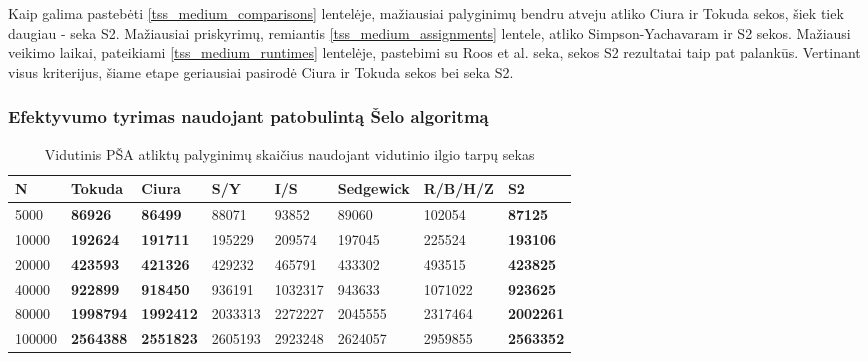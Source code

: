\documentclass{VUMIFInfKursinis}
\begin{document}
Kaip galima pastebėti \ref{tss_medium_comparisons} lentelėje, mažiausiai palyginimų bendru atveju atliko Ciura ir Tokuda sekos, šiek tiek daugiau - seka S2.
Mažiausiai priskyrimų, remiantis \ref{tss_medium_assignments} lentele, atliko Simpson-Yachavaram ir S2 sekos.
Mažiausi veikimo laikai, pateikiami \ref{tss_medium_runtimes} lentelėje, pastebimi su Roos et al. seka, sekos S2 rezultatai taip pat palankūs.
Vertinant visus kriterijus, šiame etape geriausiai pasirodė Ciura ir Tokuda sekos bei seka S2.

\subsubsection{Efektyvumo tyrimas naudojant patobulintą Šelo algoritmą}

\begin{table}[H]
  \caption{Vidutinis PŠA atliktų palyginimų skaičius naudojant vidutinio ilgio tarpų sekas}
  \label{iss_medium_comparisons}
  \begin{tabular}{|l|l|l|l|l|l|l|l|}
  \hline
  N      & Tokuda           & Ciura            & S/Y     & I/S     & Sedgewick & R/B/H/Z & S2               \\ \hline
  5000   & \textbf{86926}   & \textbf{86499}   & 88071   & 93852   & 89060     & 102054  & \textbf{87125}   \\ \hline
  10000  & \textbf{192624}  & \textbf{191711}  & 195229  & 209574  & 197045    & 225524  & \textbf{193106}  \\ \hline
  20000  & \textbf{423593}  & \textbf{421326}  & 429232  & 465791  & 433302    & 493515  & \textbf{423825}  \\ \hline
  40000  & \textbf{922899}  & \textbf{918450}  & 936191  & 1032317 & 943633    & 1071022 & \textbf{923625}  \\ \hline
  80000  & \textbf{1998794} & \textbf{1992412} & 2033313 & 2272227 & 2045555   & 2317464 & \textbf{2002261} \\ \hline
  100000 & \textbf{2564388} & \textbf{2551823} & 2605193 & 2923248 & 2624057   & 2959855 & \textbf{2563352} \\ \hline
  \end{tabular}
\end{table}
\end{document}
